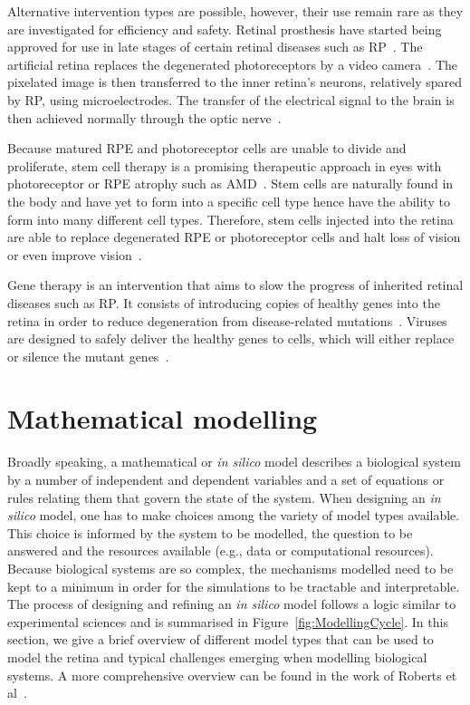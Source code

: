 \documentclass{article}
\begin{document}
Alternative intervention types are possible, however, their use remain rare as they are investigated for efficiency and safety.
Retinal prosthesis have started being approved for use in late stages of certain retinal diseases such as RP~\cite{Luo_2016}.
The artificial retina replaces the degenerated photoreceptors by a video camera~\cite{Luo_2016,Stingl_2017}.
The pixelated image is then transferred to the inner retina's neurons, relatively spared by RP, using microelectrodes.
The transfer of the electrical signal to the brain is then achieved normally through the optic nerve~\cite{Luo_2016,Stingl_2017}.

Because matured RPE and photoreceptor cells are unable to divide and proliferate, stem cell therapy is a promising therapeutic approach in eyes with photoreceptor or RPE atrophy such as AMD~\cite{Berta_2011,Stern_2015}.
Stem cells are naturally found in the body and have yet to form into a specific cell type hence have the ability to form into many different cell types.
Therefore, stem cells injected into the retina are able to replace degenerated RPE or photoreceptor cells and halt loss of vision or even improve vision~\cite{ONeill_2020}.

Gene therapy is an intervention that aims to slow the progress of inherited retinal diseases such as RP.
It consists of introducing copies of healthy genes into the retina in order to reduce degeneration from disease-related mutations~\cite{Battu_2022}.
Viruses are designed to safely deliver the healthy genes to cells, which will either replace or silence the mutant genes~\cite{Battu_2022}.









\section{Mathematical modelling}\label{sec:MathematicalPrimer}

Broadly speaking, a mathematical or \textit{in silico} model describes a biological system by a number of independent and dependent variables and a set of equations or rules relating them that govern the state of the system.
When designing an \textit{in silico} model, one has to make choices among the variety of model types available.
This choice is informed by the system to be modelled, the question to be answered and the resources available (e.g., data or computational resources).
Because biological systems are so complex, the mechanisms modelled need to be kept to a minimum in order for the simulations to be tractable and interpretable.
The process of designing and refining an \textit{in silico} model follows a logic similar to experimental sciences and is summarised in Figure~\ref{fig:ModellingCycle}.
In this section, we give a brief overview of different model types that can be used to model the retina and typical challenges emerging when modelling biological systems.
A more comprehensive overview can be found in the work of Roberts et al~\cite{Roberts_2016}.
\end{document}
